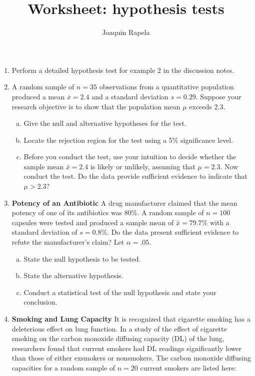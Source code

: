 \documentclass[12pt]{article}
\title{Worksheet: hypothesis tests}
\author{Joaquin Rapela}
\begin{document}
\maketitle

\begin{enumerate}

    \item Perform a detailed hypothesis test for example 2 in the discussion
        notes.

	\item A random sample of $n=35$ observations from a quantitative population
produced a mean $\bar{x}=2.4$ and a standard deviation $s=0.29$. Suppose your
research objective is to show that the population mean $\mu$ exceeds 2.3.

		\begin{enumerate}[(a)]
			\item Give the null and alternative hypotheses for the test.
			\item Locate the rejection region for the test using a 5\% signiﬁcance level.
			\item Before you conduct the test, use your intuition to decide
whether the sample mean $\bar{x}=2.4$ is likely or unlikely, assuming that
$\mu=2.3$. Now conduct the test. Do the data provide sufficient evidence to
indicate that $\mu>2.3$? 
		\end{enumerate}

	\item \textbf{Potency of an Antibiotic} A drug manufacturer claimed that the mean
	potency of one of its antibiotics was 80\%. A random sample of $n=100$
	capsules were tested and produced a sample mean of $\bar{x}=79.7\%$ with a
	standard deviation of $s=0.8\%$. Do the data present sufficient evidence to
	refute the manufacturer’s claim? Let $\alpha=.05$.

		\begin{enumerate}[(a)]
			\item State the null hypothesis to be tested.
			\item State the alternative hypothesis.
			\item Conduct a statistical test of the null hypothesis and state your conclusion.
		\end{enumerate}

	\item \textbf{Smoking and Lung Capacity} It is recognized that cigarette smoking has a deleterious effect on lung function. In a study of the effect of cigarette smoking on the carbon monoxide diffusing capacity (DL) of the lung, researchers found that current smokers had DL readings signiﬁcantly lower than those of either exsmokers or nonsmokers. The carbon monoxide diffusing capacities for a random sample of $n=20$ current smokers are listed here:


\end{enumerate}
\end{document}

